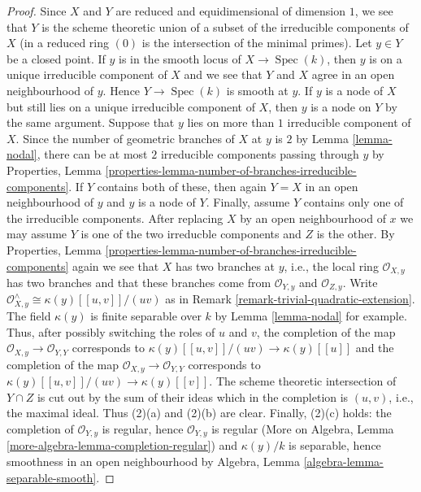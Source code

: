 \documentclass[10pt,a4paper]{amsart}
\theoremstyle{plain}
\theoremstyle{definition}
\theoremstyle{remark}
\numberwithin{equation}{subsection}
\def\Spec{\mathop{\mathrm{Spec}}}
\begin{document}
\begin{proof}
Since $X$ and $Y$ are reduced and equidimensional of dimension $1$,
we see that $Y$ is the scheme theoretic union of a subset of the
irreducible components of $X$ (in a reduced ring $(0)$
is the intersection of the minimal primes).
Let $y \in Y$ be a closed point.
If $y$ is in the smooth locus of
$X \to \Spec(k)$, then $y$ is on a unique irreducible component
of $X$ and we see that $Y$ and $X$ agree in an open neighbourhood
of $y$. Hence $Y \to \Spec(k)$ is smooth at $y$.
If $y$ is a node of $X$ but still lies on a unique irreducible
component of $X$, then $y$ is a node on $Y$ by the same argument.
Suppose that $y$ lies on more than $1$ irreducible component of $X$.
Since the number of geometric branches of $X$ at $y$ is $2$
by Lemma \ref{lemma-nodal},
there can be at most $2$ irreducible components passing through $y$
by Properties, Lemma
\ref{properties-lemma-number-of-branches-irreducible-components}.
If $Y$ contains both of these, then again $Y = X$ in an open neighbourhood
of $y$ and $y$ is a node of $Y$. Finally, assume $Y$ contains only one
of the irreducible components. After replacing $X$ by an open
neighbourhood of $x$ we may assume $Y$ is one of the two
irreducble components and $Z$ is the other. By Properties, Lemma
\ref{properties-lemma-number-of-branches-irreducible-components}
again we see that $X$ has two branches at $y$, i.e., the local ring
$\mathcal{O}_{X, y}$ has two branches and that these branches
come from $\mathcal{O}_{Y, y}$ and $\mathcal{O}_{Z, y}$. Write
$\mathcal{O}_{X, y}^\wedge \cong \kappa(y)[[u, v]]/(uv)$
as in Remark \ref{remark-trivial-quadratic-extension}.
The field $\kappa(y)$ is finite separable over $k$ by
Lemma \ref{lemma-nodal} for example.
Thus, after possibly switching the roles of $u$ and $v$,
the completion of the map
$\mathcal{O}_{X, y} \to \mathcal{O}_{Y, Y}$
corresponds to $\kappa(y)[[u, v]]/(uv) \to \kappa(y)[[u]]$
and the completion of the map
$\mathcal{O}_{X, y} \to \mathcal{O}_{Y, Y}$
corresponds to $\kappa(y)[[u, v]]/(uv) \to \kappa(y)[[v]]$.
The scheme theoretic intersection of $Y \cap Z$ is cut out
by the sum of their ideas which in the completion is $(u, v)$, i.e.,
the maximal ideal. Thus (2)(a) and (2)(b) are clear.
Finally, (2)(c) holds: the completion of $\mathcal{O}_{Y, y}$
is regular, hence $\mathcal{O}_{Y, y}$ is regular
(More on Algebra, Lemma \ref{more-algebra-lemma-completion-regular})
and $\kappa(y)/k$ is separable, hence
smoothness in an open neighbourhood
by Algebra, Lemma \ref{algebra-lemma-separable-smooth}.
\end{proof}
\end{document}
